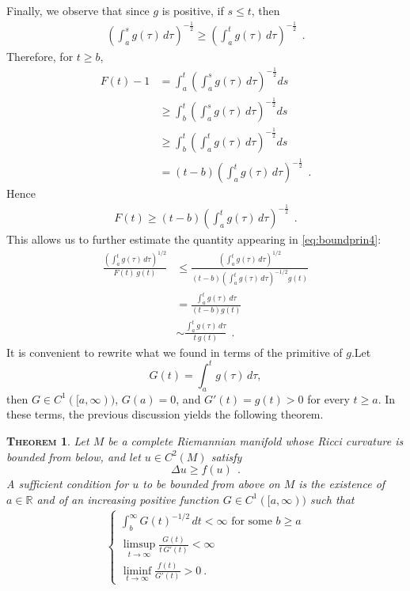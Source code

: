 \documentclass[a4paper,11pt,openright,twoside]{book}
\newcommand{\1}{\mathds{1}}
\theoremstyle{plain}
\newtheorem{thm}{\textsc{Theorem}}[chapter]
\theoremstyle{definition}
\theoremstyle{remark}
\begin{document}
Finally, we observe that since $g$ is positive, if $s\leq t$, then
\begin{align*}
	\left( \int_a^s g(\tau)\,d\tau \right)^{-\frac{1}{2}}
	\geq
	\left( \int_a^t g(\tau)\,d\tau \right)^{-\frac{1}{2}}
	\ \ .
\end{align*}
Therefore, for $t\geq b$,
\begin{align*}
	F(t)-1
	&=
	\int_a^t \left( \int_a^s g(\tau)\,d\tau \right)^{-\frac{1}{2}} ds\\
	&\geq
	\int_b^t \left( \int_a^s g(\tau)\,d\tau \right)^{-\frac{1}{2}} ds\\
	&\geq
	\int_b^t \left( \int_a^t g(\tau)\,d\tau \right)^{-\frac{1}{2}} ds\\
	&=
	(t-b)\left( \int_a^t g(\tau)\,d\tau \right)^{-\frac{1}{2}}
	\ \ .
\end{align*}
Hence
\begin{align*}
	F(t) \geq (t-b)\left( \int_a^t g(\tau)\,d\tau \right)^{-\frac{1}{2}}
	\ \ .
\end{align*}
This allows us to further estimate the quantity appearing in \eqref{eq:boundprin4}:
\begin{align*}
	\frac{\left(\displaystyle\int_a^t g(\tau)\,d\tau\right)^{1/2}}{F(t)\,g(t)}
	&\leq
	\frac{\left(\displaystyle\int_a^t g(\tau)\,d\tau\right)^{1/2}}
	{(t-b)\left( \int_a^t g(\tau)\,d\tau \right)^{-1/2} g(t)}\\
	&=
	\frac{\displaystyle\int_a^t g(\tau)\,d\tau}{(t-b)g(t)}\\
	&\sim
	\frac{\displaystyle\int_a^t g(\tau)\,d\tau}{t\,g(t)}
	\ \ .
\end{align*}
It is convenient to rewrite what we found in terms of the primitive of $g$.Let
\[
G(t)=\int_a^t g(\tau)\,d\tau,
\]
then $G\in C^1([a,\infty))$, $G(a)=0$, and $G'(t)=g(t)>0$ for every $t\geq a$. In these terms, the previous discussion yields the following theorem.
\begin{thm}\label{th:boundprin}
	Let $M$ be a complete Riemannian manifold whose Ricci curvature is bounded from below, and let $u\in C^2(M)$ satisfy
	\[
		\Delta u \geq f(u)
	\ \ .
	\]
	A sufficient condition for $u$ to be bounded from above on $M$ is the existence of $a\in\mathbb{R}$ and of an increasing positive function $G\in C^1([a,\infty))$ such that
	\begin{align*}
		\begin{cases}
			\displaystyle \int_b^\infty G(t)^{-1/2}\,dt<\infty\text{ for some }b\geq a\\
		\displaystyle \limsup_{t\to\infty}\frac{G(t)}{t\,G'(t)}<\infty\\
		\displaystyle \liminf_{t\to\infty}\frac{f(t)}{G'(t)}>0\ .
		\end{cases}
	\end{align*}
\end{thm}
\end{document}
